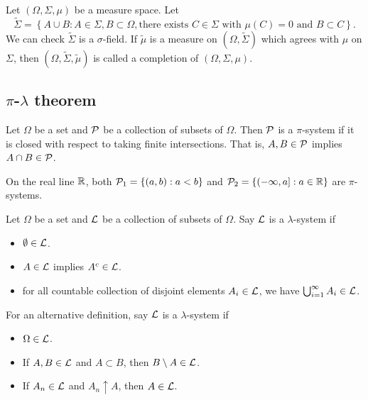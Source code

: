 \documentclass[a4paper]{article}
\begin{document}
\begin{defi}
  Let $(\Omega, \Sigma, \mu)$ be a measure space. Let
  \[
  \tilde{\Sigma} = \left\{ A \cup B : A \in \Sigma,
  B \subset \Omega, \text{there exists $C \in \Sigma$ with
  $\mu(C) = 0$ and $B \subset C$} \right\}.
  \]
  We can check $\tilde{\Sigma}$ is a $\sigma$-field. If $\tilde{\mu}$
  is a measure on $(\Omega, \tilde{\Sigma})$ which agrees with $\mu$
  on $\Sigma$, then $(\Omega, \tilde{\Sigma}, \tilde{\mu})$ is called
  a completion of $(\Omega, \Sigma, \mu)$.
\end{defi}

\subsection{$\pi$-$\lambda$ theorem}

\begin{defi}[$\pi$-system]
  Let $\Omega$ be a set and $\P$ be a collection of subsets of $\Omega$.
  Then $\P$ is a $\pi$-system if it is closed with respect to
  taking finite intersections. That is, $A, B \in \P$ implies $A \cap B
  \in \P$.
\end{defi}

\begin{eg}
  On the real line $\R$, both $\P_1 = \left\{ (a, b) : a < b \right\}$
  and $\P_2 = \left\{ (-\infty, a] : a \in \R \right\}$ are
  $\pi$-systems.

\end{eg}

\begin{defi}
  Let $\Omega$ be a set and $\L$ be a collection of subsets of $\Omega$.
  Say $\L$ is a $\lambda$-system if
  \begin{itemize}
    \item $\emptyset \in \L$.
    \item $A \in \L$ implies $A^c \in \L$.
    \item for all countable collection of disjoint elements $A_i \in \L$,
    we have $\cupinfi A_i \in \L$.
  \end{itemize}

  For an alternative definition, say $\L$ is a $\lambda$-system if 
  \begin{itemize}
    \item $\Omega \in \L$.
    \item If $A, B \in \L$ and $A \subset B$, then $B \setminus A \in \L$.
    \item If $A_n \in \L$ and $A_n \uparrow A$, then $A \in \L$.
  \end{itemize}
\end{defi}
\end{document}
